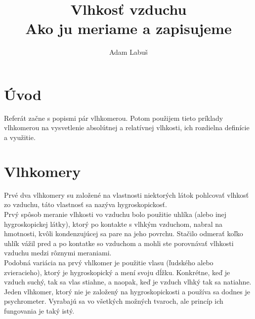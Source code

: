 \documentclass[11pt]{extarticle}
\title{
Vlhkosť vzduchu\\
\Large Ako ju meriame a zapisujeme
}
\author{Adam Labuš}
\begin{document}
\maketitle

\section{Úvod}
Referát začne s popismi pár vlhkomerou.
Potom použijem tieto príklady vlhkomerou na vysvetlenie absolútnej a relatívnej vlhkosti, ich rozdielna definície a využitie.

\section{Vlhkomery}
Prvé dva vlhkomery su založené na vlastnosti niektorých látok pohlcovať vlhkosť zo vzduchu, táto vlastnosť sa nazýva hygroskopickosť.\\

Prvý spôsob meranie vlhkosti vo vzduchu bolo použitie uhlíka (alebo inej hygroskopickej látky), ktorý po kontakte s vlhkým vzduchom, nabral na hmotnosti, kvôli kondenzujúcej sa pare na jeho povrchu.
Stačilo odmerať koľko uhlík vážil pred a po kontatke so vzduchom a mohli ste porovnávať vlhkosti vzduchu medzi rôznymi meraniami.\\

Podobná variácia na prvý vhlkomer je použitie vlasu (ľudského alebo zvieracieho), ktorý je hygroskopický a mení svoju dĺžku. Konkrétne, keď je vzduch suchý, tak sa vlas stiahne, a naopak, keď je vzduch vlhký tak sa natiahne.\\

Jeden vlhkomer, ktorý nie je založený na hygroskopickosti a používa sa dodnes je psychrometer.
Vyrabajú sa vo všetkých možných tvaroch, ale princíp ich fungovania je taký istý.\\
\end{document}
